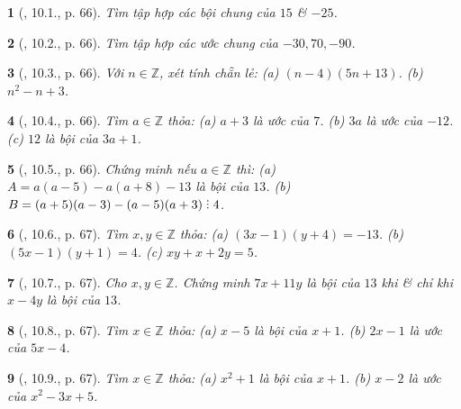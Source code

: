 \documentclass{article}
\newtheorem{baitoan}{}
\DeclareRobustCommand{\divby}{%
	\mathrel{\vbox{\baselineskip.65ex\lineskiplimit0pt\hbox{.}\hbox{.}\hbox{.}}}%
}
\begin{document}
\begin{baitoan}[\cite{Binh_boi_duong_Toan_6_tap_1}, 10.1., p. 66]
	Tìm tập hợp các bội chung của $15$ \& $-25$.
\end{baitoan}

\begin{baitoan}[\cite{Binh_boi_duong_Toan_6_tap_1}, 10.2., p. 66]
	Tìm tập hợp các ước chung của $-30,70,-90$.
\end{baitoan}

\begin{baitoan}[\cite{Binh_boi_duong_Toan_6_tap_1}, 10.3., p. 66]
	Với $n\in\mathbb{Z}$, xét tính chẵn lẻ: (a) $(n - 4)(5n + 13)$. (b) $n^2 - n + 3$.
\end{baitoan}

\begin{baitoan}[\cite{Binh_boi_duong_Toan_6_tap_1}, 10.4., p. 66]
	Tìm $a\in\mathbb{Z}$ thỏa: (a) $a + 3$ là ước của $7$. (b) $3a$ là ước của $-12$. (c) $12$ là bội của $3a + 1$.
\end{baitoan}

\begin{baitoan}[\cite{Binh_boi_duong_Toan_6_tap_1}, 10.5., p. 66]
	Chứng minh nếu $a\in\mathbb{Z}$ thì: (a) $A = a(a - 5) - a(a + 8) - 13$ là bội của $13$. (b) $B = (a + 5)(a - 3) - (a - 5)(a + 3)\divby4$.
\end{baitoan}

\begin{baitoan}[\cite{Binh_boi_duong_Toan_6_tap_1}, 10.6., p. 67]
	Tìm $x,y\in\mathbb{Z}$ thỏa: (a) $(3x - 1)(y + 4) = -13$. (b) $(5x - 1)(y + 1) = 4$. (c) $xy + x + 2y = 5$.
\end{baitoan}

\begin{baitoan}[\cite{Binh_boi_duong_Toan_6_tap_1}, 10.7., p. 67]
	Cho $x,y\in\mathbb{Z}$. Chứng minh $7x + 11y$ là bội của $13$ khi \& chỉ khi $x - 4y$ là bội của $13$.
\end{baitoan}

\begin{baitoan}[\cite{Binh_boi_duong_Toan_6_tap_1}, 10.8., p. 67]
	Tìm $x\in\mathbb{Z}$ thỏa: (a) $x - 5$ là bội của $x + 1$. (b) $2x - 1$ là ước của $5x - 4$.
\end{baitoan}

\begin{baitoan}[\cite{Binh_boi_duong_Toan_6_tap_1}, 10.9., p. 67]
	Tìm $x\in\mathbb{Z}$ thỏa: (a) $x^2 + 1$ là bội của $x + 1$. (b) $x - 2$ là ước của $x^2 - 3x + 5$.
\end{baitoan}
\end{document}
